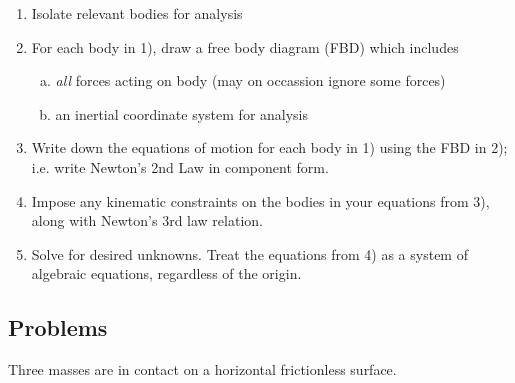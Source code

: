 \begin{enumerate}[1)]
	\item Isolate relevant bodies for analysis
	\item For each body in 1), draw a free body diagram (FBD) which includes
	
	\begin{enumerate}[(a)]
		\item \textit{all} forces acting on body (may on occassion ignore some forces)
		\item an inertial coordinate system for analysis
	\end{enumerate}
	\item Write down the equations of motion for each body in 1) using the FBD in 2); i.e. write Newton's 2nd Law in component form.
	\item Impose any kinematic constraints on the bodies in your equations from 3), along with Newton's 3rd law relation.
	\item Solve for desired unknowns. Treat the equations from 4) as a system of algebraic equations, regardless of the origin.
\end{enumerate}

\subsection{Problems}

\begin{example}
	Three masses are in contact on a horizontal frictionless surface.
\end{example}